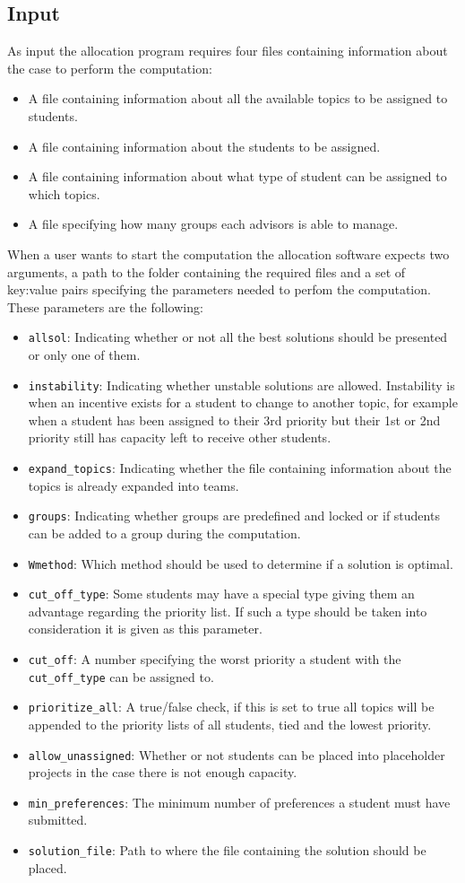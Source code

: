 \subsection{Input}\label{algo_in}
As input the allocation program requires four files containing information about the case to perform the computation:
\begin{itemize}
\item A file containing information about all the available topics to be assigned to students.
\item A file containing information about the students to be assigned.
\item A file containing information about what type of student can be assigned to which topics.
\item A file specifying how many groups each advisors is able to manage.
\end{itemize}
When a user wants to start the computation the allocation software expects two arguments, a path to the folder containing the required files and a set of key:value pairs specifying the parameters needed to perfom the computation.\\
These parameters are the following:
\begin{itemize}
	\item \verb|allsol|: Indicating whether or not all the best solutions should be presented or only one of them.
	\item \verb|instability|: Indicating whether unstable solutions are allowed. Instability is when an incentive exists for a student to change to another topic, for example when a student has been assigned to their 3rd priority but their 1st or 2nd priority still has capacity left to receive other students.
	\item \verb|expand_topics|: Indicating whether the file containing information about the topics is already expanded into teams.
	\item \verb|groups|: Indicating whether groups are predefined and locked or if students can be added to a group during the computation.
	\item \verb|Wmethod|: Which method should be used to determine if a solution is optimal.
	\item \verb|cut_off_type|: Some students may have a special type giving them an advantage regarding the priority list. If such a type should be taken into consideration it is given as this parameter.
	\item \verb|cut_off|: A number specifying the worst priority a student with the \verb|cut_off_type| can be assigned to.
	\item \verb|prioritize_all|: A true/false check, if this is set to true all topics will be appended to the priority lists of all students, tied and the lowest priority.
	\item \verb|allow_unassigned|: Whether or not students can be placed into placeholder projects in the case there is not enough capacity.
	\item \verb|min_preferences|: The minimum number of preferences a student must have submitted.
	\item \verb|solution_file|: Path to where the file containing the solution should be placed.
\end{itemize}
